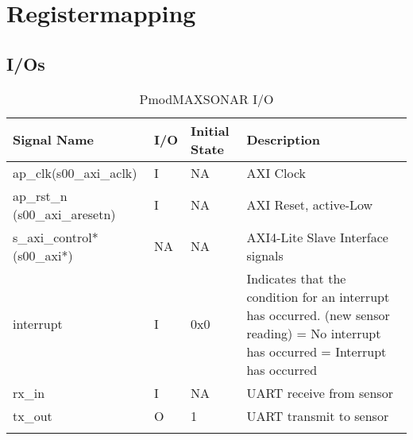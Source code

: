 \section{Registermapping}

\subsection{I/Os}
\begin{longtable}{|p{4cm}|p{1cm}|p{2cm}|p{6.6cm}|}
\hline
\textbf{Signal Name} & \textbf{I/O} & \textbf{Initial State} & \textbf{Description} \\
\hline
ap\_clk(s00\_axi\_aclk) & I & NA & AXI Clock \\
\hline
ap\_rst\_n (s00\_axi\_aresetn) & I & NA & AXI Reset, active-Low \\
\hline
s\_axi\_control* (s00\_axi*) & NA & NA & AXI4-Lite Slave Interface signals \\
\hline
interrupt & I & 0x0 & Indicates that the condition for an interrupt has occurred. (new sensor reading)
\newline 0 = No interrupt has occurred
\newline 1 = Interrupt has occurred \\
\hline
rx\_in & I & NA & UART receive from sensor \\
\hline
tx\_out & O & 1 & UART transmit to sensor \\
\hline
\caption{PmodMAXSONAR I/O}
\end{longtable}

